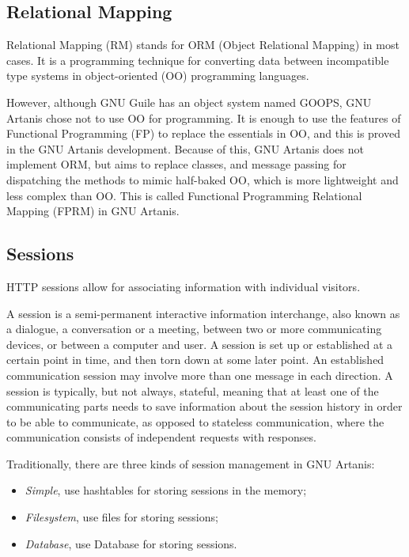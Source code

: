 \documentclass[numbers,numberedpars]{sigplanconf}
\begin{document}
\subsection{Relational Mapping}

Relational Mapping (RM) stands for ORM (Object Relational Mapping) in most cases.
It is a programming technique for converting data between incompatible type systems in object-oriented (OO) programming languages.

However, although GNU Guile has an object system named GOOPS, GNU Artanis chose not to use OO for programming. It is enough to use the features of Functional Programming (FP) to replace the essentials in OO, and this is proved in the GNU Artanis development.
Because of this, GNU Artanis does not implement ORM, but aims to replace classes, and message passing for dispatching the methods to mimic half-baked OO, which is more lightweight and less complex than OO. This is called Functional Programming Relational Mapping (FPRM) in GNU Artanis.

\subsection{Sessions}

HTTP sessions allow for associating information with individual visitors.

A session is a semi-permanent interactive information interchange, also known as a dialogue, a conversation or a meeting, between two or more communicating devices, or between a computer and user. A session is set up or established at a certain point in time, and then torn down at some later point. An established communication session may involve more than one message in each direction. A session is typically, but not always, stateful, meaning that at least one of the communicating parts needs to save information about the session history in order to be able to communicate, as opposed to stateless communication, where the communication consists of independent requests with responses.

Traditionally, there are three kinds of session management in GNU Artanis:

\begin{itemize}
\item {\it Simple}, use hashtables for storing sessions in the memory;
\item {\it Filesystem}, use files for storing sessions;
\item {\it Database}, use Database for storing sessions.
\end{itemize}
\end{document}
